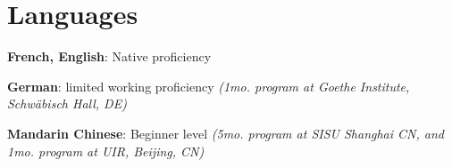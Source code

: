 \section{Languages}

\ifextended
  \begin{adcvlanguages}
    \adcvlanguagesheader
    \adcvlanguagesfooter
  \end{adcvlanguages}

\else

  \textbf{French, English}: Native proficiency

  \textbf{German}: limited working proficiency \textit{\footnotesize(1mo. program at Goethe Institute, Schwäbisch Hall, DE)}

  \textbf{Mandarin Chinese}: Beginner level \textit{\footnotesize(5mo. program at SISU Shanghai CN, and 1mo. program at UIR, Beijing, CN)}

\fi